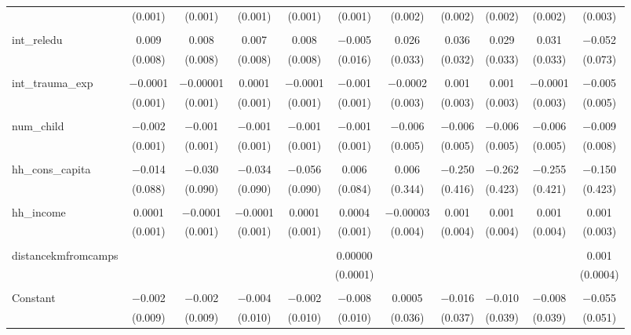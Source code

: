 \begin{table}[H]
\begin{tabular}{@{\extracolsep{4pt}}lcccccccccc}
  & (0.001) & (0.001) & (0.001) & (0.001) & (0.001) & (0.002) & (0.002) & (0.002) & (0.002) & (0.003) \\ 
  & & & & & & & & & & \\ 
 int\_reledu & 0.009 & 0.008 & 0.007 & 0.008 & $-$0.005 & 0.026 & 0.036 & 0.029 & 0.031 & $-$0.052 \\ 
  & (0.008) & (0.008) & (0.008) & (0.008) & (0.016) & (0.033) & (0.032) & (0.033) & (0.033) & (0.073) \\ 
  & & & & & & & & & & \\ 
 int\_trauma\_exp & $-$0.0001 & $-$0.00001 & 0.0001 & $-$0.0001 & $-$0.001 & $-$0.0002 & 0.001 & 0.001 & $-$0.0001 & $-$0.005 \\ 
  & (0.001) & (0.001) & (0.001) & (0.001) & (0.001) & (0.003) & (0.003) & (0.003) & (0.003) & (0.005) \\ 
  & & & & & & & & & & \\ 
 num\_child & $-$0.002 & $-$0.001 & $-$0.001 & $-$0.001 & $-$0.001 & $-$0.006 & $-$0.006 & $-$0.006 & $-$0.006 & $-$0.009 \\ 
  & (0.001) & (0.001) & (0.001) & (0.001) & (0.001) & (0.005) & (0.005) & (0.005) & (0.005) & (0.008) \\ 
  & & & & & & & & & & \\ 
 hh\_cons\_capita & $-$0.014 & $-$0.030 & $-$0.034 & $-$0.056 & 0.006 & 0.006 & $-$0.250 & $-$0.262 & $-$0.255 & $-$0.150 \\ 
  & (0.088) & (0.090) & (0.090) & (0.090) & (0.084) & (0.344) & (0.416) & (0.423) & (0.421) & (0.423) \\ 
  & & & & & & & & & & \\ 
 hh\_income & 0.0001 & $-$0.0001 & $-$0.0001 & 0.0001 & 0.0004 & $-$0.00003 & 0.001 & 0.001 & 0.001 & 0.001 \\ 
  & (0.001) & (0.001) & (0.001) & (0.001) & (0.001) & (0.004) & (0.004) & (0.004) & (0.004) & (0.003) \\ 
  & & & & & & & & & & \\ 
 distancekmfromcamps &  &  &  &  & 0.00000 &  &  &  &  & 0.001 \\ 
  &  &  &  &  & (0.0001) &  &  &  &  & (0.0004) \\ 
  & & & & & & & & & & \\ 
 Constant & $-$0.002 & $-$0.002 & $-$0.004 & $-$0.002 & $-$0.008 & 0.0005 & $-$0.016 & $-$0.010 & $-$0.008 & $-$0.055 \\ 
  & (0.009) & (0.009) & (0.010) & (0.010) & (0.010) & (0.036) & (0.037) & (0.039) & (0.039) & (0.051) \\ 

\end{tabular}
\end{table}
